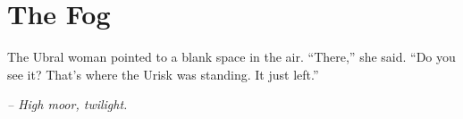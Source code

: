 \chapter*{The Fog}

The Ubral woman pointed to a blank space in the air. “There,” she said. “Do you see it? That’s where the Urisk was standing. It just left.”

\smallskip

\noindent \textit{– High moor, twilight.}

